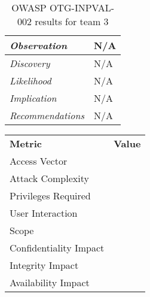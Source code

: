 \documentclass[headsepline,footsepline,footinclude=false,oneside,fontsize=11pt,paper=a4,listof=totoc,bibliography=totoc]{scrbook} %
\begin{document}
\begin{table}[H]
	\centering
	\begin{tabular}{l p{11cm}}
		\textit{Observation} &  N/A\\
		\hline
		\textit{Discovery} &  N/A \\
		\hline
		\textit{Likelihood} & N/A\\
		\hline
		\textit{Implication} & N/A\\
		\hline
		\textit{Recommendations} & N/A\\
	\end{tabular}
	\caption{OWASP OTG-INPVAL-002 results for team 3}
	\label{table:scenario2}
\end{table}
\vspace{0.5cm}
\begin{center}
	\begin{tabular}{ll}
		\rowcolor[HTML]{34CDF9}
		{\color[HTML]{ECF4FF} \textbf{Metric}}        & {\color[HTML]{ECF4FF} \textbf{Value}} \\
		\rowcolor[HTML]{BBDAFF}
		{\color[HTML]{333333} Access Vector}          & {\color[HTML]{333333} }               \\
		\rowcolor[HTML]{ECF4FF}
		{\color[HTML]{333333} Attack Complexity}      & {\color[HTML]{333333} }               \\
		\rowcolor[HTML]{BBDAFF}
		{\color[HTML]{333333} Privileges Required}    & {\color[HTML]{333333} }               \\
		\rowcolor[HTML]{ECF4FF}
		{\color[HTML]{333333} User Interaction}       & {\color[HTML]{333333} }               \\
		\rowcolor[HTML]{BBDAFF}
		{\color[HTML]{333333} Scope}                  & {\color[HTML]{333333} }               \\
		\rowcolor[HTML]{ECF4FF}
		{\color[HTML]{333333} Confidentiality Impact} & {\color[HTML]{333333} }               \\
		\rowcolor[HTML]{BBDAFF}
		{\color[HTML]{333333} Integrity Impact}       & {\color[HTML]{333333} }               \\
		\rowcolor[HTML]{ECF4FF}
		{\color[HTML]{333333} Availability Impact}    & {\color[HTML]{333333} }
	\end{tabular}
\end{center}
\pagebreak
\end{document}
